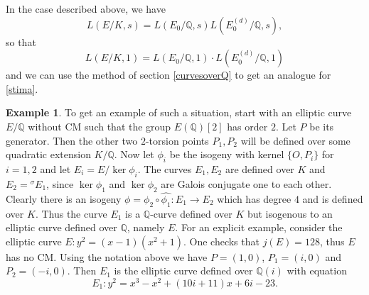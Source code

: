 \documentclass[11pt]{amsart}
\theoremstyle{definition}
\newtheorem{ex}[definizione]{Example}
\begin{document}
		In the case described above, we have
		$$L(E/K,s)=L(E_0/{\mathbb{Q}},s)L(E_0^{(d)}/{\mathbb{Q}},s),$$
		so that
		$$L(E/K,1)=L(E_0/{\mathbb{Q}},1)\cdot L(E_0^{(d)}/{\mathbb{Q}},1)$$
		and we can use the method of section \ref{curvesoverQ} to get an analogue for \eqref{stima}.
  			\begin{ex}
      			To get an example of such a situation, start with an elliptic curve $E/{\mathbb{Q}}$ without CM such that the group $E({\mathbb{Q}})[2]$ has order $2$. Let $P$ be its generator. Then the other two $2$-torsion points $P_1,P_2$ will be defined over some quadratic extension $K/{\mathbb{Q}}$. Now let $\phi_i$ be the isogeny with kernel $\{O,P_i\}$ for $i=1,2$ and let $E_i=E/\ker \phi_i$. The curves $E_1,E_2$ are defined over $K$ and $E_2={{}^\sigma\!} E_1$, since $\ker \phi_1$ and $\ker\phi_2$ are Galois conjugate one to each other. Clearly there is an isogeny $\phi=\phi_2\circ\widehat{\phi_1}\colon E_1\to E_2$ which has degree $4$ and is defined over $K$. Thus the curve $E_1$ is a ${\mathbb{Q}}$-curve defined over $K$ but isogenous to an elliptic curve defined over ${\mathbb{Q}}$, namely $E$.
      			For an explicit example, consider the elliptic curve $E\colon y^2=(x-1)(x^2+1)$. One checks that $j(E)=128$, thus $E$ has no CM. Using the notation above we have $P=(1,0)$, $P_1=(i,0)$ and $P_2=(-i,0)$. Then $E_1$ is the elliptic curve defined over ${\mathbb{Q}}(i)$ with equation
				$$E_1\colon y^2=x^3-x^2+(10i+11)x+6i-23.$$
		\end{ex}
\end{document}
